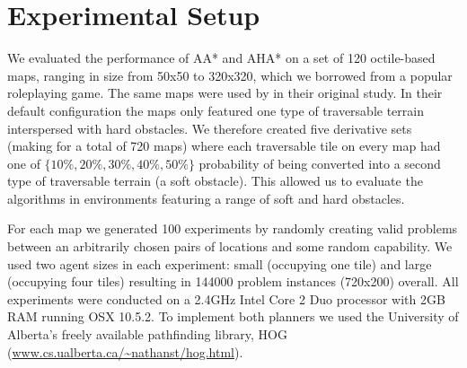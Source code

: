 \section{Experimental Setup}
We evaluated the performance of AA* and AHA* on a set of 120 octile-based maps, ranging in size from 50x50 to 320x320, which we borrowed from a popular roleplaying game.
The same maps were used by \cite{botea04} in their original study.
In their default configuration the maps only featured one type of traversable terrain interspersed with hard obstacles. 
We therefore created five derivative sets (making for a total of 720 maps) where each traversable tile on every map had one of $\lbrace 10\%, 20\%, 30\%, 40\%, 50\% \rbrace$ probability of being converted into a second type of traversable terrain (a soft obstacle). 
This allowed us to evaluate the algorithms in environments featuring a range of soft and hard obstacles.
\par \indent
For each map we generated 100 experiments by randomly creating valid problems between an arbitrarily chosen pairs of locations and some random capability.
We used two agent sizes in each experiment: small (occupying one tile) and large (occupying four tiles) resulting in 144000 problem instances (720x200) overall.
All experiments were conducted on a 2.4GHz Intel Core 2 Duo processor with 2GB RAM running OSX 10.5.2.
To implement both planners we used the University of Alberta's freely available pathfinding library, HOG (\url{www.cs.ualberta.ca/~nathanst/hog.html}). 
